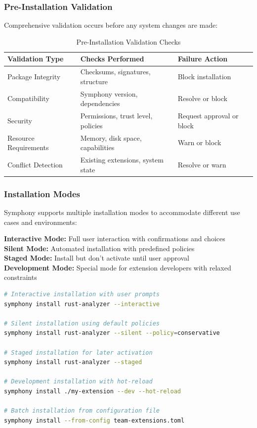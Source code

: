 \subsubsection{Pre-Installation Validation}
\label{subsubsec:pre-installation-validation}

Comprehensive validation occurs before any system changes are made:

\begin{table}[h]
\centering
\caption{Pre-Installation Validation Checks}
\label{tab:pre-installation-validation}
\begin{tabular}{@{}lll@{}}
\toprule
\textbf{Validation Type} & \textbf{Checks Performed} & \textbf{Failure Action} \\
\midrule
Package Integrity & Checksums, signatures, structure & Block installation \\
Compatibility & Symphony version, dependencies & Resolve or block \\
Security & Permissions, trust level, policies & Request approval or block \\
Resource Requirements & Memory, disk space, capabilities & Warn or block \\
Conflict Detection & Existing extensions, system state & Resolve or warn \\
\bottomrule
\end{tabular}
\end{table}

\subsubsection{Installation Modes}
\label{subsubsec:installation-modes}

Symphony supports multiple installation modes to accommodate different use cases and environments:

\begin{infobox}[title=Installation Mode Selection]
\textbf{Interactive Mode:} Full user interaction with confirmations and choices \\
\textbf{Silent Mode:} Automated installation with predefined policies \\
\textbf{Staged Mode:} Install but don't activate until user approval \\
\textbf{Development Mode:} Special mode for extension developers with relaxed constraints
\end{infobox}

\begin{lstlisting}[language=bash,caption=Installation Mode Examples]
# Interactive installation with user prompts
symphony install rust-analyzer --interactive

# Silent installation using default policies
symphony install rust-analyzer --silent --policy=conservative

# Staged installation for later activation
symphony install rust-analyzer --staged

# Development installation with hot-reload
symphony install ./my-extension --dev --hot-reload

# Batch installation from configuration file
symphony install --from-config team-extensions.toml
\end{lstlisting}


